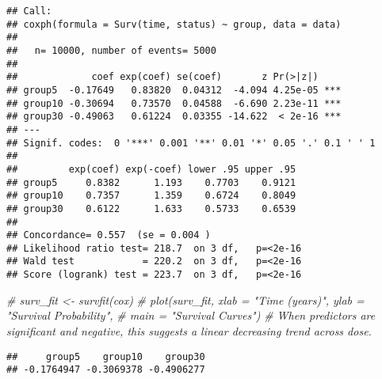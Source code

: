 \documentclass[
]{article}
\newenvironment{Shaded}{\begin{snugshade}}{\end{snugshade}}
\newcommand{\CommentTok}[1]{\textcolor[rgb]{0.56,0.35,0.01}{\textit{#1}}}
\newcommand{\NormalTok}[1]{#1}
\newcommand{\OtherTok}[1]{\textcolor[rgb]{0.56,0.35,0.01}{#1}}
\newcommand{\SpecialCharTok}[1]{\textcolor[rgb]{0.81,0.36,0.00}{\textbf{#1}}}
\begin{document}
\begin{verbatim}
## Call:
## coxph(formula = Surv(time, status) ~ group, data = data)
## 
##   n= 10000, number of events= 5000 
## 
##             coef exp(coef) se(coef)       z Pr(>|z|)    
## group5  -0.17649   0.83820  0.04312  -4.094 4.25e-05 ***
## group10 -0.30694   0.73570  0.04588  -6.690 2.23e-11 ***
## group30 -0.49063   0.61224  0.03355 -14.622  < 2e-16 ***
## ---
## Signif. codes:  0 '***' 0.001 '**' 0.01 '*' 0.05 '.' 0.1 ' ' 1
## 
##         exp(coef) exp(-coef) lower .95 upper .95
## group5     0.8382      1.193    0.7703    0.9121
## group10    0.7357      1.359    0.6724    0.8049
## group30    0.6122      1.633    0.5733    0.6539
## 
## Concordance= 0.557  (se = 0.004 )
## Likelihood ratio test= 218.7  on 3 df,   p=<2e-16
## Wald test            = 220.2  on 3 df,   p=<2e-16
## Score (logrank) test = 223.7  on 3 df,   p=<2e-16
\end{verbatim}

\begin{Shaded}
\begin{Highlighting}[]
\CommentTok{\# surv\_fit \textless{}{-} survfit(cox)}
\CommentTok{\# plot(surv\_fit, xlab = "Time (years)", ylab = "Survival Probability", }
     \CommentTok{\# main = "Survival Curves")}
\CommentTok{\# When predictors are significant and negative, this suggests a linear decreasing trend across dose.}
\end{Highlighting}
\end{Shaded}

\begin{Shaded}
\end{Shaded}

\begin{verbatim}
##     group5    group10    group30 
## -0.1764947 -0.3069378 -0.4906277
\end{verbatim}
\end{document}
